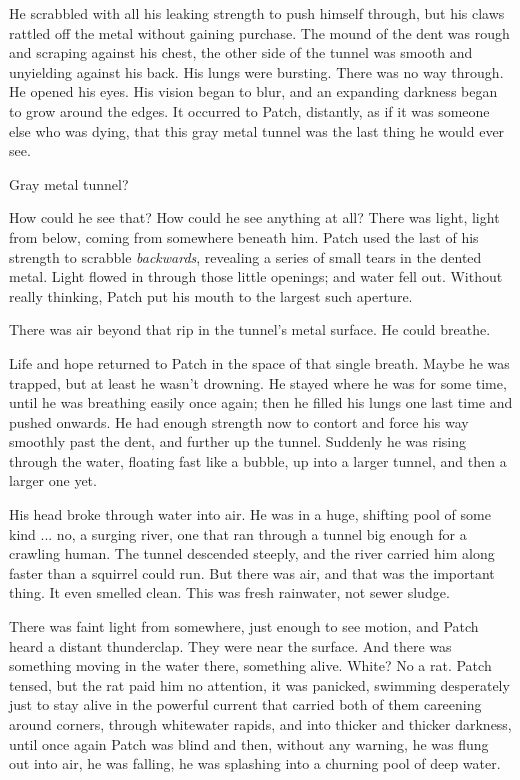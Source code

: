 \documentclass[12pt]{book}
\begin{document}
He scrabbled with all his leaking strength to push himself through, but his claws rattled off the metal without gaining purchase. The mound of the dent was rough and scraping against his chest, the other side of the tunnel was smooth and unyielding against his back. His lungs were bursting. There was no way through. He opened his eyes. His vision began to blur, and an expanding darkness began to grow around the edges. It occurred to Patch, distantly, as if it was someone else who was dying, that this gray metal tunnel was the last thing he would ever see.

Gray metal tunnel?

How could he see that? How could he see anything at all? There was light, light from below, coming from somewhere beneath him. Patch used the last of his strength to scrabble {\it backwards}, revealing a series of small tears in the dented metal. Light flowed in through those little openings; and water fell out. Without really thinking, Patch put his mouth to the largest such aperture.

There was air beyond that rip in the tunnel's metal surface. He could breathe.

Life and hope returned to Patch in the space of that single breath. Maybe he was trapped, but at least he wasn't drowning. He stayed where he was for some time, until he was breathing easily once again; then he filled his lungs one last time and pushed onwards. He had enough strength now to contort and force his way smoothly past the dent, and further up the tunnel. Suddenly he was rising through the water, floating fast like a bubble, up into a larger tunnel, and then a larger one yet.

His head broke through water into air. He was in a huge, shifting pool of some kind ... no, a surging river, one that ran through a tunnel big enough for a crawling human. The tunnel descended steeply, and the river carried him along faster than a squirrel could run. But there was air, and that was the important thing. It even smelled clean. This was fresh rainwater, not sewer sludge.

There was faint light from somewhere, just enough to see motion, and Patch heard a distant thunderclap. They were near the surface. And there was something moving in the water there, something alive. White? No %
a rat. Patch tensed, but the rat paid him no attention, it was panicked, swimming desperately just to stay alive in the powerful current that carried both of them careening around corners, through whitewater rapids, and into thicker and thicker darkness, until once again Patch was blind %
and then, without any warning, he was flung out into air, he was falling, he was splashing into a churning pool of deep water.
\end{document}
